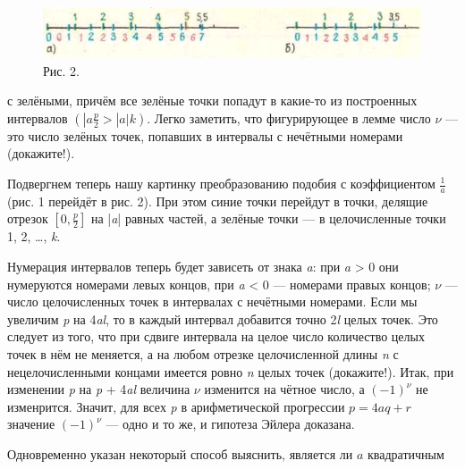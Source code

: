\newpage
\pagestyle{fancy}
\fancyhf{}
\fancyfoot[R]{\thepage}
\begin{figure}[h]
\begin{flushleft}
\includegraphics[width = 19cm]{picture2}
\end{flushleft}
\caption*{\hspace{0.5cm}Рис. 2.}
\end{figure}

\begin{minipage}[t]{0.4\textwidth}
\large{с зелёными, причём все зелёные точки попадут в какие-то из построенных интервалов $\left(|\textit{a}\frac{\textit{p}}{2} > |\textit{a}|\textit{k}\right)$. Легко заметить, что фигурирующее в лемме число $\nu$ --- это число зелёных точек, попавших в интервалы с нечётными номерами (докажите!).
\setlength{\parindent}{4ex}

Подвергнем теперь нашу картинку преобразованию подобия с коэффициентом $\frac{1}{a}$ (рис. 1 перейдёт в рис. 2). При этом синие точки перейдут в точки, делящие отрезок $\left[0, \frac{p}{2} \right]$ на |\textit{a}| равных частей, а зелёные точки --- в целочисленные точки 1, 2, \ldots, \textit{k}.

Нумерация интервалов теперь будет зависеть от знака \textit{a}: при \textit{a} > 0 они нумеруются номерами левых концов, при \textit{a} < 0 --- номерами правых концов; $\nu$ --- число целочисленных точек в интервалах с нечётными номерами. Если мы увеличим \textit{p} на 4\textit{al}, то в каждый интервал добавится точно 2\textit{l} целых точек. Это следует из того, что при сдвиге интервала на целое число количество целых точек в нём не меняется, а на любом отрезке целочисленной длины \textit{n} с нецелочисленными концами имеется ровно \textit{n} целых точек (докажите!). Итак, при изменении \textit{p} на \textit{p} + 4\textit{al} величина $\nu$ изменится на чётное число, а $(-1)^{\nu}$ не изменрится.  Значит, для всех \textit{p} в арифметической прогрессии $p = 4aq + r$  значение $(-1)^{\nu}$ --- одно и то же, и гипотеза Эйлера доказана.

Одновременно указан некоторый способ выяснить, является ли $a$ квадратичным}
\end{minipage}
\hspace{1.25cm}
